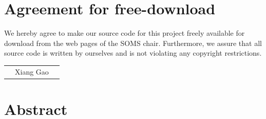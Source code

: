 \def\CTeXPreproc{Created by ctex v0.2.14, don't edit!}\documentclass[11pt]{article}
\begin{document}

\newpage


\newpage
\section*{Agreement for free-download}
\bigskip


\bigskip


\large We hereby agree to make our source code for this project freely available for download from the web pages of the SOMS chair. Furthermore, we assure that all source code is written by ourselves and is not violating any copyright restrictions.

\begin{center}

\bigskip


\bigskip


\begin{tabular}{@{}p{3.3cm}@{}p{6cm}@{}@{}p{6cm}@{}}
\begin{minipage}{3cm}

\end{minipage}
&
\begin{minipage}{6cm}
\vspace{2mm} \large Xiang Gao

\vspace{\baselineskip}

\end{minipage}
&
\begin{minipage}{6cm}

\end{minipage}
\end{tabular}


\end{center}
\newpage


% 


\tableofcontents

\newpage


\section{Abstract}
\end{document}
